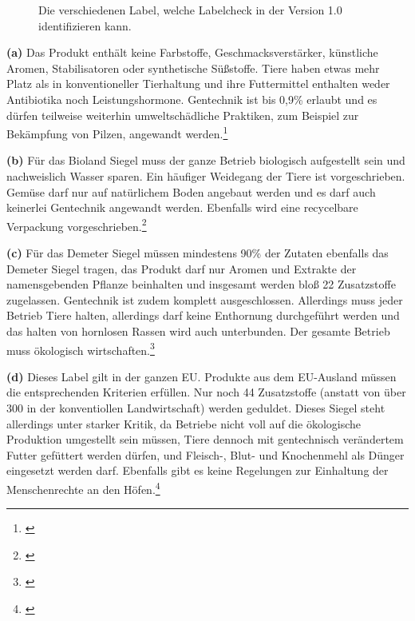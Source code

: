 \begin{figure}[H]
    \centering
    \qquad
    \qquad
    \qquad
    \qquad
    \qquad
    \qquad
    \caption[Label]{Die verschiedenen Label, welche Labelcheck in der Version 1.0 identifizieren kann.}
    \label{labels}%
\end{figure}

\textbf{(a)} Das Produkt enthält keine Farbstoffe, Geschmacksverstärker, künstliche Aromen, Stabilisatoren oder synthetische Süßstoffe. Tiere haben etwas mehr Platz als in konventioneller Tierhaltung und ihre Futtermittel enthalten weder Antibiotika noch Leistungshormone. Gentechnik ist bis 0,9\% erlaubt und es dürfen teilweise weiterhin umweltschädliche Praktiken, zum Beispiel zur Bekämpfung von Pilzen, angewandt werden.\footnote{\cite{egoeko}}

\noindent\textbf{(b)} Für das Bioland Siegel muss der ganze Betrieb biologisch aufgestellt sein und nachweislich Wasser sparen. Ein häufiger Weidegang der Tiere ist vorgeschrieben. Gemüse darf nur auf natürlichem Boden angebaut werden und es darf auch keinerlei Gentechnik angewandt werden. Ebenfalls wird eine recycelbare Verpackung vorgeschrieben.\footnote{\cite{verschiedenelabel}}

\noindent\textbf{(c)} Für das Demeter Siegel müssen mindestens 90\% der Zutaten ebenfalls das Demeter Siegel tragen, das Produkt darf nur Aromen und Extrakte der namensgebenden Pflanze beinhalten und insgesamt werden bloß 22 Zusatzstoffe zugelassen. Gentechnik ist zudem komplett ausgeschlossen. Allerdings muss jeder Betrieb Tiere halten, allerdings darf keine Enthornung durchgeführt werden und das halten von hornlosen Rassen wird auch unterbunden. Der gesamte Betrieb muss ökologisch wirtschaften.\footnote{\cite{verschiedenelabel}}

\noindent\textbf{(d)} Dieses Label gilt in der ganzen EU. Produkte aus dem EU-Ausland müssen die entsprechenden Kriterien erfüllen. Nur noch 44 Zusatzstoffe (anstatt von über 300 in der konventiollen Landwirtschaft) werden geduldet. Dieses Siegel steht allerdings unter starker Kritik, da Betriebe nicht voll auf die ökologische Produktion umgestellt sein müssen, Tiere dennoch mit gentechnisch verändertem Futter gefüttert werden dürfen, und Fleisch-, Blut- und Knochenmehl als Dünger eingesetzt werden darf. Ebenfalls gibt es keine Regelungen zur Einhaltung der Menschenrechte an den Höfen.\footnote{\cite{verschiedenelabel}}

